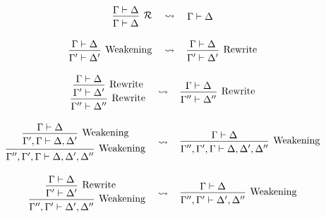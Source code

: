\begin{figure}[H]
  \centering
  \begin{gather*}
  \begin{prooftree}
  \hypo{\Gamma \vdash \Delta}
  \infer1[$\mathcal{R}$]{\Gamma \vdash \Delta}
  \end{prooftree}
  \quad\leadsto\quad
  \begin{prooftree}
  \hypo{\Gamma \vdash \Delta}
  \end{prooftree} \\[1em]
  \begin{prooftree}
  \hypo{\Gamma \vdash \Delta}
  \infer1[Weakening]{\Gamma' \vdash \Delta'}
  \end{prooftree}
  \quad\leadsto\quad
  \begin{prooftree}
  \hypo{\Gamma \vdash \Delta}
  \infer1[Rewrite]{\Gamma' \vdash \Delta'}
  \end{prooftree} \\[1em]
  \begin{prooftree}
  \hypo{\Gamma \vdash \Delta}
  \infer1[Rewrite]{\Gamma' \vdash \Delta'}
  \infer1[Rewrite]{\Gamma'' \vdash \Delta''}
  \end{prooftree}
  \quad\leadsto\quad
  \begin{prooftree}
  \hypo{\Gamma \vdash \Delta}
  \infer1[Rewrite]{\Gamma'' \vdash \Delta''}
  \end{prooftree} \\[1em]
  \begin{prooftree}
  \hypo{\Gamma \vdash \Delta}
  \infer1[Weakening]{\Gamma', \Gamma \vdash \Delta, \Delta'}
  \infer1[Weakening]{\Gamma'', \Gamma', \Gamma \vdash \Delta, \Delta', \Delta''}
  \end{prooftree}
  \quad\leadsto\quad
  \begin{prooftree}
  \hypo{\Gamma \vdash \Delta}
  \infer1[Weakening]{\Gamma'', \Gamma', \Gamma \vdash \Delta, \Delta', \Delta''}
  \end{prooftree} \\[1em]
  \begin{prooftree}
  \hypo{\Gamma \vdash \Delta}
  \infer1[Rewrite]{\Gamma' \vdash \Delta'}
  \infer1[Weakening]{\Gamma'', \Gamma' \vdash \Delta', \Delta''}
  \end{prooftree}
  \quad\leadsto\quad
  \begin{prooftree}
  \hypo{\Gamma \vdash \Delta}
  \infer1[Weakening]{\Gamma'', \Gamma' \vdash \Delta', \Delta''}

\end{prooftree}
\end{gather*}
\end{figure}
